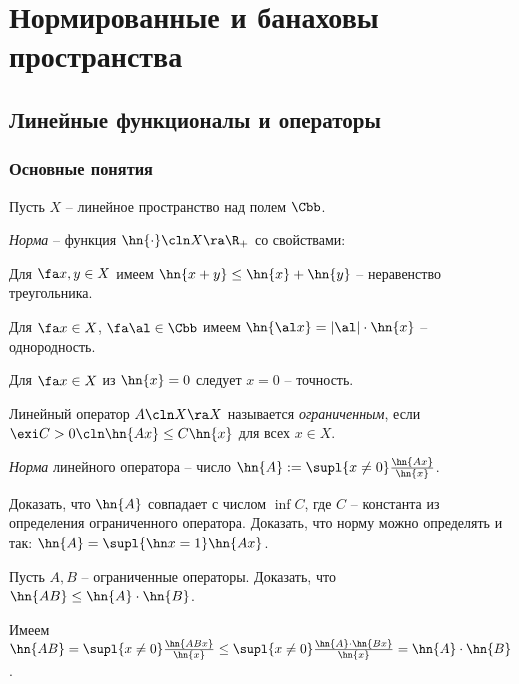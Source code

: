 \documentclass[a4paper]{article}
\begin{document}
\section{Нормированные и банаховы пространства}

\subsection{Линейные функционалы и операторы}

\subsubsection{Основные понятия}

Пусть $X$ -- линейное пространство над полем $\Cbb$.

\begin{df}
\emph{Норма} -- функция $\hn{\cdot}\cln X\ra \R_+$ со свойствами:
\begin{points}{-3}
\item Для $\fa x, y \in X$ имеем $\hn{x+y} \le \hn{x} + \hn{y}$ -- неравенство треугольника.
\item Для $\fa x \in X$, $\fa \al \in \Cbb$ имеем $\hn{\al x} = |\al|\cdot\hn{x}$ -- однородность.
\item Для $\fa x \in X$ из $\hn{x} = 0$ следует $x = 0$ -- точность.
\end{points}
\end{df}

\begin{df}
Линейный оператор $A\cln X \ra X$ называется \emph{ограниченным}, если
$\exi C > 0\cln \hn{Ax} \le C\hn{x}$ для всех $x \in X$.
\end{df}

\begin{df}
\emph{Норма} линейного оператора -- число $\hn{A} := \supl{x\neq 0} \frac{\hn{Ax}}{\hn{x}}$.
\end{df}

\begin{problem}
Доказать, что $\hn{A}$ совпадает с числом $\inf C$, где $C$ -- константа из
определения ограниченного оператора. Доказать, что норму можно определять и так:
$\hn{A} = \supl{\hn x =1} \hn{Ax}$.
\end{problem}

\begin{problem}
Пусть $A, B$ -- ограниченные операторы. Доказать, что $\hn{AB} \le \hn{A} \cdot \hn{B}$.
\end{problem}
\begin{solution}
Имеем $\hn{AB} = \supl{x \neq 0} \frac{\hn{ABx}}{\hn{x}} \le
\supl{x \neq 0} \frac{\hn{A}\cdot \hn{Bx}}{\hn{x}} = \hn{A}\cdot \hn{B}$.
\end{solution}
\end{document}
